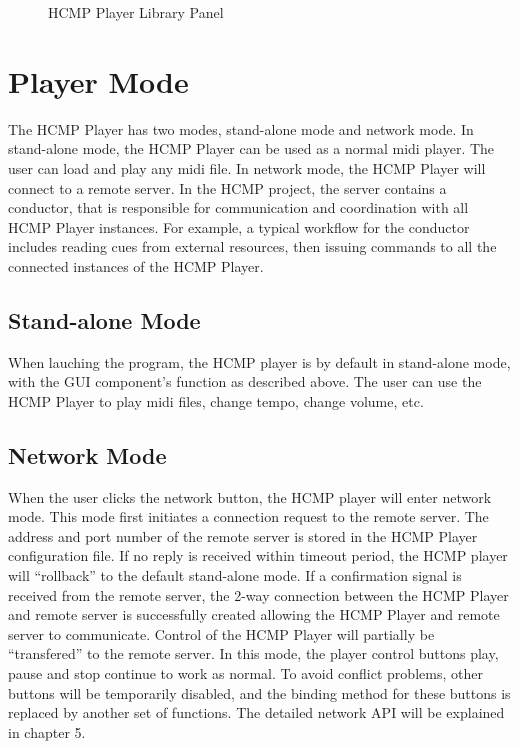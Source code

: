 \begin{figure}[H]
\caption{HCMP Player Library Panel}
\label{fig:speciation}
\end{figure}

\section{Player Mode}

The HCMP Player has two modes, stand-alone mode and network mode. 
In stand-alone mode, the HCMP Player can be used as a normal midi player. 
The user can load and play any midi file. In network mode, 
the HCMP Player will connect to a remote 
server. In the HCMP project, the server contains a conductor, that 
is responsible for communication and coordination with all HCMP Player instances. 
For example, 
a typical workflow for the conductor includes reading cues from external resources, 
then issuing commands to all the connected instances of the HCMP Player.

\subsection{Stand-alone Mode}

When lauching the program, the HCMP player is by default in stand-alone mode, 
with the GUI component's function as described above. 
The user can use the HCMP Player to play midi files, change tempo, change volume, etc.


\subsection{Network Mode}

When the user clicks the network button, 
the HCMP player will enter
network mode. This mode first initiates a connection request 
to the remote server. The address and port number of the remote server is 
stored in the HCMP Player configuration file. If no reply is received within
timeout period, the HCMP player will ``rollback'' to the default stand-alone mode.
If a confirmation signal is received from the
remote server, the 2-way connection between the HCMP Player and 
remote server is successfully created allowing the HCMP Player and 
remote server to communicate. Control of the HCMP 
Player will partially be ``transfered'' to the remote server. 
In this mode, the player control buttons play, pause   
and stop continue to work as normal. To avoid conflict problems, other buttons will 
be temporarily disabled, and the binding method for these buttons is replaced by
another set of functions. The detailed network API will be explained  
in chapter 5.
